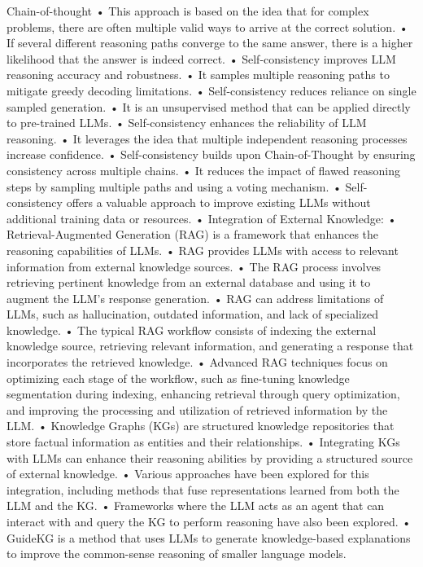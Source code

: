 \begin{frame}{Chain-of-thought}
	•	This approach is based on the idea that for complex problems, there are often multiple valid ways to arrive at the correct solution.
	•	If several different reasoning paths converge to the same answer, there is a higher likelihood that the answer is indeed correct.
	•	Self-consistency improves LLM reasoning accuracy and robustness.
	•	It samples multiple reasoning paths to mitigate greedy decoding limitations.
	•	Self-consistency reduces reliance on single sampled generation.
	•	It is an unsupervised method that can be applied directly to pre-trained LLMs.
	•	Self-consistency enhances the reliability of LLM reasoning.
	•	It leverages the idea that multiple independent reasoning processes increase confidence.
	•	Self-consistency builds upon Chain-of-Thought by ensuring consistency across multiple chains.
	•	It reduces the impact of flawed reasoning steps by sampling multiple paths and using a voting mechanism.
	•	Self-consistency offers a valuable approach to improve existing LLMs without additional training data or resources.
	•	Integration of External Knowledge:
	•	Retrieval-Augmented Generation (RAG) is a framework that enhances the reasoning capabilities of LLMs.
	•	RAG provides LLMs with access to relevant information from external knowledge sources.
	•	The RAG process involves retrieving pertinent knowledge from an external database and using it to augment the LLM’s response generation.
	•	RAG can address limitations of LLMs, such as hallucination, outdated information, and lack of specialized knowledge.
	•	The typical RAG workflow consists of indexing the external knowledge source, retrieving relevant information, and generating a response that incorporates the retrieved knowledge.
	•	Advanced RAG techniques focus on optimizing each stage of the workflow, such as fine-tuning knowledge segmentation during indexing, enhancing retrieval through query optimization, and improving the processing and utilization of retrieved information by the LLM.
	•	Knowledge Graphs (KGs) are structured knowledge repositories that store factual information as entities and their relationships.
	•	Integrating KGs with LLMs can enhance their reasoning abilities by providing a structured source of external knowledge.
	•	Various approaches have been explored for this integration, including methods that fuse representations learned from both the LLM and the KG.
	•	Frameworks where the LLM acts as an agent that can interact with and query the KG to perform reasoning have also been explored.
	•	GuideKG is a method that uses LLMs to generate knowledge-based explanations to improve the common-sense reasoning of smaller language models.

\end{frame}
